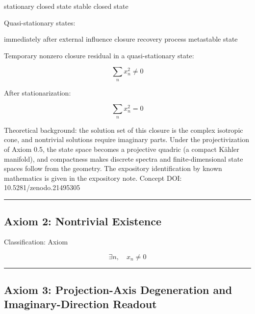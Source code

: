 \documentclass[
  a4paper,
]{article}
\newenvironment{Shaded}{}{}
\newcommand{\NormalTok}[1]{#1}
\begin{document}
\begin{Shaded}
\begin{Highlighting}[]
\NormalTok{stationary closed state}
\NormalTok{stable closed state}
\end{Highlighting}
\end{Shaded}

Quasi-stationary states:

\begin{Shaded}
\begin{Highlighting}[]
\NormalTok{immediately after external influence}
\NormalTok{closure recovery process}
\NormalTok{metastable state}
\end{Highlighting}
\end{Shaded}

Temporary nonzero closure residual in a quasi-stationary state:

\[
\sum_n x_n^2\ne0
\]

After stationarization:

\[
\sum_n x_n^2=0
\]

Theoretical background: the solution set of this closure is the complex
isotropic cone, and nontrivial solutions require imaginary parts. Under
the projectivization of Axiom 0.5, the state space becomes a projective
quadric (a compact Kähler manifold), and compactness makes discrete
spectra and finite-dimensional state spaces follow from the geometry.
The expository identification by known mathematics is given in the
expository note. Concept DOI: 10.5281/zenodo.21495305

\begin{center}\rule{0.5\linewidth}{0.5pt}\end{center}

\subsection{Axiom 2: Nontrivial
Existence}\label{axiom-2-nontrivial-existence}

Classification: Axiom

\[
\exists n,\quad x_n\neq0
\]

\begin{center}\rule{0.5\linewidth}{0.5pt}\end{center}

\subsection{Axiom 3: Projection-Axis Degeneration and
Imaginary-Direction
Readout}\label{axiom-3-projection-axis-degeneration-and-imaginary-direction-readout}
\end{document}
